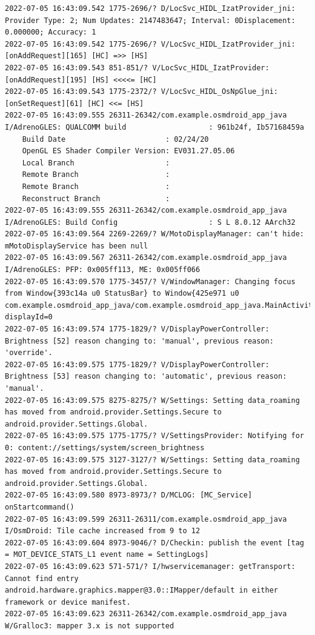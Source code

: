 \documentclass[a4paper,12pt]{book}
\begin{document}
\begin{lstlisting}
2022-07-05 16:43:09.542 1775-2696/? D/LocSvc_HIDL_IzatProvider_jni: Provider Type: 2; Num Updates: 2147483647; Interval: 0Displacement: 0.000000; Accuracy: 1
2022-07-05 16:43:09.542 1775-2696/? V/LocSvc_HIDL_IzatProvider_jni: [onAddRequest][165] [HC] =>> [HS]
2022-07-05 16:43:09.543 851-851/? V/LocSvc_HIDL_IzatProvider: [onAddRequest][195] [HS] <<<<= [HC]
2022-07-05 16:43:09.543 1775-2372/? V/LocSvc_HIDL_OsNpGlue_jni: [onSetRequest][61] [HC] <<= [HS]
2022-07-05 16:43:09.555 26311-26342/com.example.osmdroid_app_java I/AdrenoGLES: QUALCOMM build                   : 961b24f, Ib57168459a
    Build Date                       : 02/24/20
    OpenGL ES Shader Compiler Version: EV031.27.05.06
    Local Branch                     : 
    Remote Branch                    : 
    Remote Branch                    : 
    Reconstruct Branch               : 
2022-07-05 16:43:09.555 26311-26342/com.example.osmdroid_app_java I/AdrenoGLES: Build Config                     : S L 8.0.12 AArch32
2022-07-05 16:43:09.564 2269-2269/? W/MotoDisplayManager: can't hide: mMotoDisplayService has been null
2022-07-05 16:43:09.567 26311-26342/com.example.osmdroid_app_java I/AdrenoGLES: PFP: 0x005ff113, ME: 0x005ff066
2022-07-05 16:43:09.570 1775-3457/? V/WindowManager: Changing focus from Window{393c14a u0 StatusBar} to Window{425e971 u0 com.example.osmdroid_app_java/com.example.osmdroid_app_java.MainActivity} displayId=0
2022-07-05 16:43:09.574 1775-1829/? V/DisplayPowerController: Brightness [52] reason changing to: 'manual', previous reason: 'override'.
2022-07-05 16:43:09.575 1775-1829/? V/DisplayPowerController: Brightness [53] reason changing to: 'automatic', previous reason: 'manual'.
2022-07-05 16:43:09.575 8275-8275/? W/Settings: Setting data_roaming has moved from android.provider.Settings.Secure to android.provider.Settings.Global.
2022-07-05 16:43:09.575 1775-1775/? V/SettingsProvider: Notifying for 0: content://settings/system/screen_brightness
2022-07-05 16:43:09.575 3127-3127/? W/Settings: Setting data_roaming has moved from android.provider.Settings.Secure to android.provider.Settings.Global.
2022-07-05 16:43:09.580 8973-8973/? D/MCLOG: [MC_Service] onStartcommand()
2022-07-05 16:43:09.599 26311-26311/com.example.osmdroid_app_java I/OsmDroid: Tile cache increased from 9 to 12
2022-07-05 16:43:09.604 8973-9046/? D/Checkin: publish the event [tag = MOT_DEVICE_STATS_L1 event name = SettingLogs]
2022-07-05 16:43:09.623 571-571/? I/hwservicemanager: getTransport: Cannot find entry android.hardware.graphics.mapper@3.0::IMapper/default in either framework or device manifest.
2022-07-05 16:43:09.623 26311-26342/com.example.osmdroid_app_java W/Gralloc3: mapper 3.x is not supported

\end{lstlisting}
\end{document}
